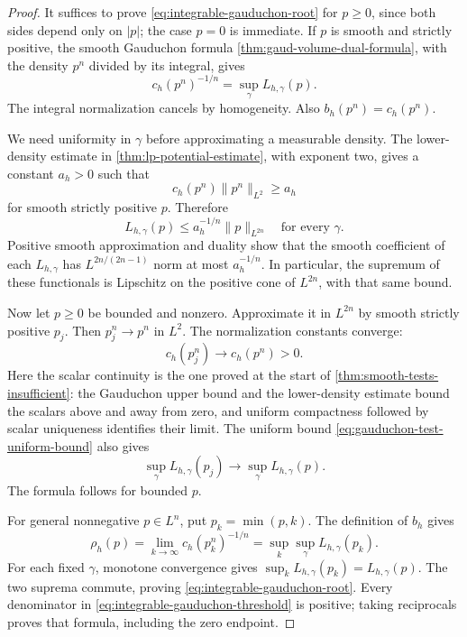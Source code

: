\begin{proof}
It suffices to prove \eqref{eq:integrable-gauduchon-root} for $p\geq0$, since both sides depend only on $|p|$; the case $p=0$ is immediate. If $p$ is smooth and strictly positive, the smooth Gauduchon formula \cref{thm:gaud-volume-dual-formula}, with the density $p^n$ divided by its integral, gives
\[
 c_h(p^n)^{-1/n}=\sup_\gamma L_{h,\gamma}(p).
\]
The integral normalization cancels by homogeneity. Also $b_h(p^n)=c_h(p^n)$.

We need uniformity in $\gamma$ before approximating a measurable density. The lower-density estimate in \cref{thm:lp-potential-estimate}, with exponent two, gives a constant $a_h>0$ such that
\[
 c_h(p^n)\|p^n\|_{L^2}\geq a_h
\]
for smooth strictly positive $p$. Therefore
\begin{equation}\label{eq:gauduchon-test-uniform-bound}
 L_{h,\gamma}(p)\leq a_h^{-1/n}\|p\|_{L^{2n}}
 \quad\text{for every }\gamma.
\end{equation}
Positive smooth approximation and duality show that the smooth coefficient of each $L_{h,\gamma}$ has $L^{2n/(2n-1)}$ norm at most $a_h^{-1/n}$. In particular, the supremum of these functionals is Lipschitz on the positive cone of $L^{2n}$, with that same bound.

Now let $p\geq0$ be bounded and nonzero. Approximate it in $L^{2n}$ by smooth strictly positive $p_j$. Then $p_j^n\to p^n$ in $L^2$. The normalization constants converge:
\[
 c_h(p_j^n)\longrightarrow c_h(p^n)>0.
\]
Here the scalar continuity is the one proved at the start of \cref{thm:smooth-tests-insufficient}: the Gauduchon upper bound and the lower-density estimate bound the scalars above and away from zero, and uniform compactness followed by scalar uniqueness identifies their limit. The uniform bound \eqref{eq:gauduchon-test-uniform-bound} also gives
\[
 \sup_\gamma L_{h,\gamma}(p_j)
       \longrightarrow\sup_\gamma L_{h,\gamma}(p).
\]
The formula follows for bounded $p$.

For general nonnegative $p\in L^n$, put $p_k=\min(p,k)$. The definition of $b_h$ gives
\[
 \rho_h(p)=\lim_{k\to\infty}c_h(p_k^n)^{-1/n}
          =\sup_k\sup_\gamma L_{h,\gamma}(p_k).
\]
For each fixed $\gamma$, monotone convergence gives
$\sup_kL_{h,\gamma}(p_k)=L_{h,\gamma}(p)$. The two suprema commute, proving \eqref{eq:integrable-gauduchon-root}. Every denominator in \eqref{eq:integrable-gauduchon-threshold} is positive; taking reciprocals proves that formula, including the zero endpoint.
\end{proof}

